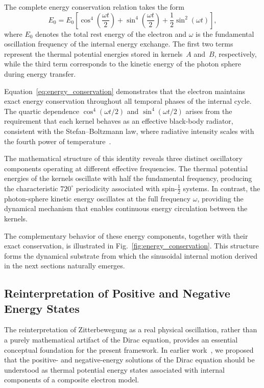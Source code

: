 \documentclass[%
 reprint,
 amsmath,amssymb,
 aps,
 prb,
]{revtex4-2}
\numberwithin{equation}{section}
\begin{document}
The complete energy conservation relation takes the form
\begin{equation}
\boxed{E_0
= E_0\!\left[
\cos^4\!\left(\frac{\omega t}{2}\right)
+ \sin^4\!\left(\frac{\omega t}{2}\right)
+ \frac{1}{2}\sin^2(\omega t)
\right]},
\label{eq:energy_conservation}
\end{equation}
where $E_0$ denotes the total rest energy of the electron and $\omega$ is the fundamental oscillation frequency of the internal energy exchange. The first two terms represent the thermal potential energies stored in kernels~$A$ and~$B$, respectively, while the third term corresponds to the kinetic energy of the photon sphere during energy transfer.

Equation~\eqref{eq:energy_conservation} demonstrates that the electron maintains exact energy conservation throughout all temporal phases of the internal cycle. The quartic dependence $\cos^4(\omega t/2)$ and $\sin^4(\omega t/2)$ arises from the requirement that each kernel behaves as an effective black-body radiator, consistent with the Stefan--Boltzmann law, where radiative intensity scales with the fourth power of temperature~\cite{hanamura17765097}.

The mathematical structure of this identity reveals three distinct oscillatory components operating at different effective frequencies. The thermal potential energies of the kernels oscillate with half the fundamental frequency, producing the characteristic $720^\circ$ periodicity associated with spin-$\tfrac{1}{2}$ systems. In contrast, the photon-sphere kinetic energy oscillates at the full frequency $\omega$, providing the dynamical mechanism that enables continuous energy circulation between the kernels.

The complementary behavior of these energy components, together with their exact conservation, is illustrated in Fig.~\ref{fig:energy_conservation}. This structure forms the dynamical substrate from which the sinusoidal internal motion derived in the next sections naturally emerges.


\subsection{Reinterpretation of Positive and Negative Energy States}
\label{subsec:reinterpretation_positive}

The reinterpretation of Zitterbewegung as a real physical oscillation, rather than a purely mathematical artifact of the Dirac equation, provides an essential conceptual foundation for the present framework. In earlier work~\cite{hanamura17760132}, we proposed that the positive- and negative-energy solutions of the Dirac equation should be understood as thermal potential energy states associated with internal components of a composite electron model.
\end{document}
